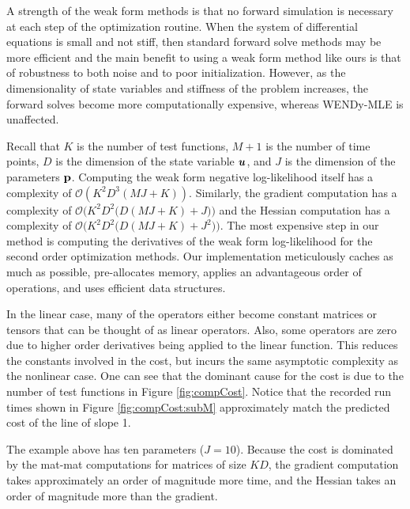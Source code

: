 A strength of the weak form methods is that no forward simulation is necessary at each step of the optimization routine. When the system of differential equations is small and not stiff, then standard forward solve methods may be more efficient and the main benefit to using a weak form method like ours is that of robustness to both noise and to poor initialization. However, as the dimensionality of state variables and stiffness of the problem increases, the forward solves become more computationally expensive, whereas WENDy-MLE is unaffected. 

Recall that $K$ is the number of test functions, $M+1$ is the number of time points, $D$ is the dimension of the state variable $\boldsymbol{u}$, and $J$ is the dimension of the parameters $\mathbf{p}$. Computing the weak form negative log-likelihood itself has a complexity of $\mathcal{O}(K^2D^3(MJ + K))$. Similarly, the gradient computation has a complexity of $\mathcal{O}\bigl(K^2D^2\bigl(D(MJ + K)+J\bigr)\bigr)$ and the Hessian computation has a complexity of $\mathcal{O}\bigl(K^2D^2\bigl(D(MJ + K)+J^2\bigr)\bigr)$. The most expensive step in our method is computing the derivatives of the weak form log-likelihood for the second order optimization methods. Our implementation meticulously caches as much as possible, pre-allocates memory, applies an advantageous order of operations, and uses efficient data structures. 

In the linear case, many of the operators either become constant matrices or tensors that can be thought of as linear operators. Also, some operators are zero due to higher order derivatives being applied to the linear function. This reduces the constants involved in the cost, but incurs the same asymptotic complexity as the nonlinear case. One can see that the dominant cause for the cost is due to the number of test functions in Figure \ref{fig:compCost}. Notice that the recorded run times shown in Figure \ref{fig:compCost:subM} approximately match the predicted cost of the line of slope 1. 

The example above has ten parameters ($J=10$). Because the cost is dominated by the mat-mat computations for matrices of size $KD$, the gradient computation takes approximately an order of magnitude more time, and the Hessian takes an order of magnitude more than the gradient. 

